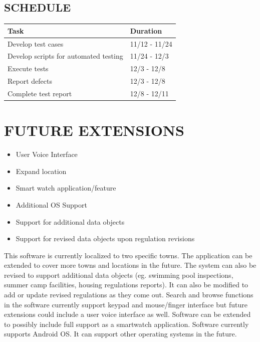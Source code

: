 \documentclass[twoside,letterpaper]{article}
\begin{document}
\subsection{SCHEDULE}
{\rmfamily\color{black}
\begin{center}
\begin{tabular}{ | M{5cm} | M{5cm}| } 
\hline
\textbf{Task} & \textbf{Duration}\\ 
\hline
Develop test cases & 11/12 - 11/24 \\ 
\hline
Develop scripts for automated testing & 11/24 - 12/3 \\ 
\hline
Execute tests & 12/3 - 12/8 \\ 
\hline
Report defects & 12/3 - 12/8 \\ 
\hline
Complete test report & 12/8 - 12/11 \\ 
\hline
\end{tabular}
\end{center}
}

\clearpage\section{FUTURE EXTENSIONS}
\begin{itemize}
\item{User Voice Interface}
\item{Expand location}
\item{Smart watch application/feature}
\item{Additional OS Support}
\item{Support for additional data objects}
\item{Support for revised data objects upon regulation revisions}
\end{itemize}
{\rmfamily\color{black}
This software is currently localized to two specific towns.  The application can be extended to cover more towns and locations in the future. The system can also be revised to support additional data objects (eg. swimming pool inspections, summer camp facilities, housing regulations reports). It can also be modified to add or update revised regulations as they come out.
Search and browse functions in the software currently support keypad and mouse/finger interface but future extensions could include a user voice interface as well. 
Software can be extended to possibly include full support as a smartwatch application. 
Software currently supports Android OS. It can support other operating systems in the future.}
\end{document}
